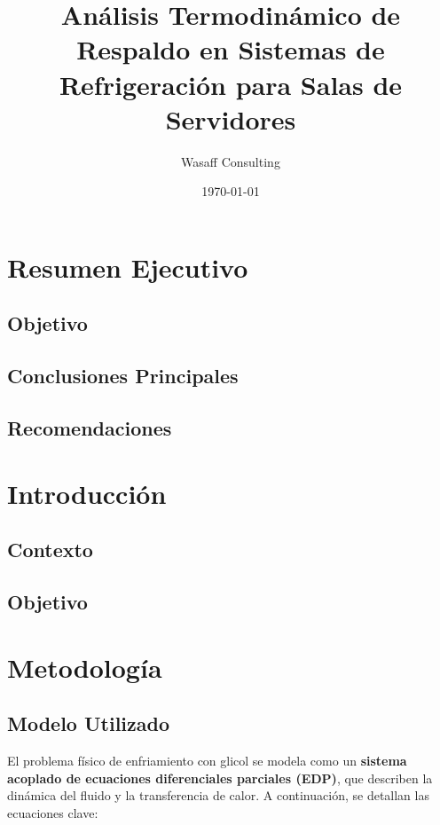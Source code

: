 \documentclass[12pt, a4paper]{article}
\begin{document}
\title{Análisis Termodinámico de Respaldo en Sistemas de Refrigeración para Salas de Servidores}
\author{Wasaff Consulting}
\date{\today}
\maketitle

\newpage
\section{Resumen Ejecutivo}

\subsection*{Objetivo}

\subsection{Conclusiones Principales}

\subsection*{Recomendaciones}

\section{Introducción}

\subsection*{Contexto}

\subsection*{Objetivo}

\newpage
\section{Metodología}

\subsection*{Modelo Utilizado}

El problema físico de enfriamiento con glicol se modela como un \textbf{sistema acoplado de ecuaciones diferenciales parciales (EDP)}, que describen la dinámica del fluido y la transferencia de calor. A continuación, se detallan las ecuaciones clave:
\end{document}
